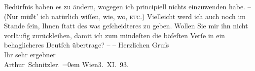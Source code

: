 \begin{ledgroupsized}[t]{13cm}
               Bedürfnis haben es zu ändern, wogegen ich principiell nichts einzuwenden habe. – (Nur
               müßt’ ich natürlich wiſſen, wie, wo, \textsc{etc.})\pend
           \pstart
           {\pb}Vielleicht werd ich
               auch noch im Stande ſein, Ihnen ſtatt des \textsc{\label{K_L00279_1v}\label{K_L00279_1h}} was geſcheidteres zu geben. Wollen Sie mir ihn nicht vorläufig zurückleihen,
               damit ich zum mindeſten die böſeſten Verſe in ein behaglicheres Deutſch übertrage? – \pend
           \pstart
           – Herzlichen Gruſs{\\[\baselineskip]}Ihr sehr ergebner{\\[\baselineskip]}\spacefill\mbox{Arthur Schnitzler.}\pend
           \leftskip=0em{}\pstart
           Wien3. XI. 93.\pend
           \endnumbering{}\end{ledgroupsized}  \newcommand{\dateiname}{L00279}\newcommand{\titel}{Arthur Schnitzler an Hermann Bahr, 3. 11. 1893}\newcommand{\editorInnen}{ Kurt Ifkovits,  Martin Anton Müller}
            \footnotesize
\begin{ledgroupsized}[t]{11.5cm}
\end{ledgroupsized}
         
      